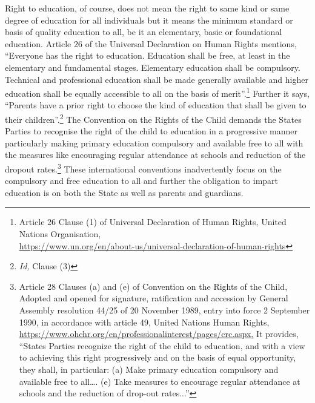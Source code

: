 \begin{multicols}{2}
\vspace{-.1cm}


\vspace{-.1cm}

\noi
Right to education, of course, does not mean the right to same kind or same degree of
education for all individuals but it means the minimum standard or basis of quality education
to all, be it an elementary, basic or foundational education. Article 26 of the Universal
Declaration on Human Rights mentions, “Everyone has the right to education. Education
shall be free, at least in the elementary and fundamental stages. Elementary education shall be
compulsory. Technical and professional education shall be made generally available and
higher education shall be equally accessible to all on the basis of merit”.\footnote{Article 26 Clause (1) of Universal Declaration of Human Rights, United Nations Organisation,\\ \url{https://www.un.org/en/about-us/universal-declaration-of-human-rights}} Further it says, “Parents have a prior right to choose the kind of education that shall be given to their
children”.\footnote{\textit{Id,} Clause (3)} The Convention on the Rights of the Child demands the States Parties to
recognise the right of the child to education in a progressive manner particularly making
primary education compulsory and available free to all with the measures like encouraging
regular attendance at schools and reduction of the dropout rates.\footnote{Article 28 Clauses (a) and (e) of Convention on the Rights of the Child, Adopted and opened for signature, ratification and accession by General Assembly resolution 44/25 of 20 November 1989, entry into force 2 September 1990, in accordance with article 49, United Nations Human Rights, \url{https://www.ohchr.org/en/professionalinterest/pages/crc.aspx,} It provides, “States Parties recognize the right of the child to education, and with a view to achieving this right progressively and on the basis of equal
opportunity, they shall, in particular: (a) Make primary education compulsory and available free to all…. (e)
Take measures to encourage regular attendance at schools and the reduction of drop-out rates...”} These international
conventions inadvertently focus on the compulsory and free education to all and further the
obligation to impart education is on both the State as well as parents and guardians.

\vspace{-.1cm}


\end{multicols}
